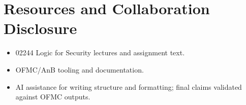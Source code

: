 \documentclass[11pt,a4paper]{article}
\begin{document}
\section{Resources and Collaboration Disclosure}
\begin{itemize}[leftmargin=1.2em]
  \item 02244 Logic for Security lectures and assignment text.
  \item OFMC/AnB tooling and documentation.
  \item AI assistance for writing structure and formatting; final claims validated against OFMC outputs.
\end{itemize}
\end{document}
